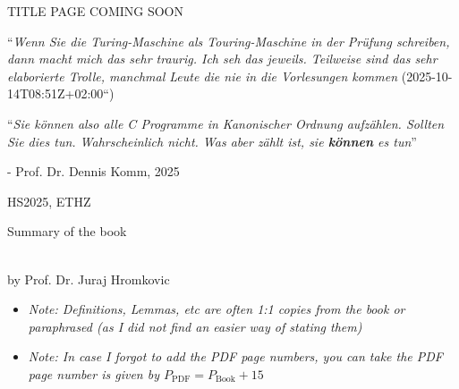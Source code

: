 \documentclass{article}
\begin{document}
\startDocument
\usetcolorboxes

\vspace{2cm}
\begin{Huge}
    \begin{center}
        TITLE PAGE COMING SOON
    \end{center}
\end{Huge}


\vspace{4cm}
\begin{center}
    \begin{Large}
        ``\textit{Wenn Sie die Turing-Maschine als Touring-Maschine in der Prüfung schreiben, dann macht mich das sehr traurig. Ich seh das jeweils. Teilweise sind das sehr elaborierte Trolle, manchmal Leute die nie in die Vorlesungen kommen} (2025-10-14T08:51Z+02:00``)

        ``\textit{Sie können also alle C Programme in Kanonischer Ordnung aufzählen. Sollten Sie dies tun. Wahrscheinlich nicht. Was aber zählt ist, sie \textbf{können} es tun}''
    \end{Large}

    \hspace{3cm} - Prof. Dr. Dennis Komm, 2025
\end{center}

\vspace{3cm}
\begin{center}
    HS2025, ETHZ\\[0.2cm]
    \begin{Large}
        Summary of the book \color{MidnightBlue}\color{black}
    \end{Large}\\[0.2cm]
    by Prof. Dr. Juraj Hromkovic
\end{center}

\newpage


\begin{scriptsize}
    \begin{itemize}
        \item \textit{Note: Definitions, Lemmas, etc are often 1:1 copies from the book or paraphrased (as I did not find an easier way of stating them)}
        \item \textit{Note: In case I forgot to add the PDF page numbers, you can take the PDF page number is given by $P_{\text{PDF}} = P_{\text{Book}} + 15$}
    \end{itemize}
\end{scriptsize}
\end{document}
